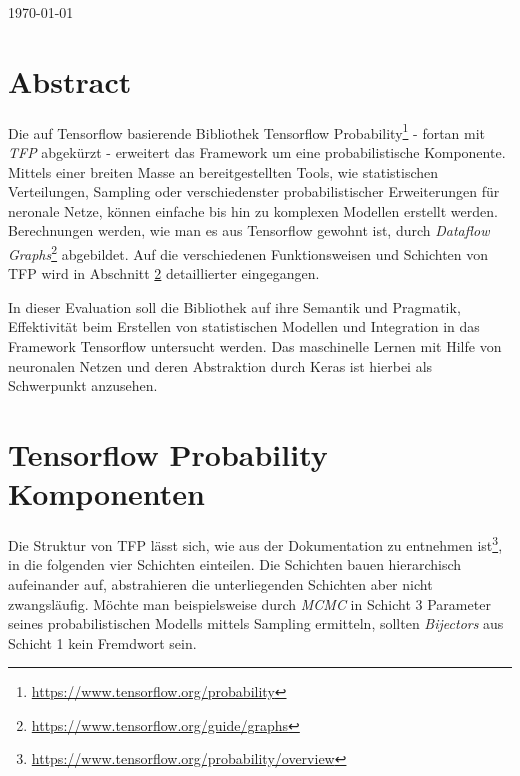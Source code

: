 \documentclass[12pt]{article}
\begin{document}
\begin{titlepage}
\begin{center}

\vspace{\fill} %

{\large \today}\\[3cm] %

\end{center}

\end{titlepage}



\tableofcontents

\newpage


\section{Abstract}
\label{abstract}
Die auf Tensorflow basierende Bibliothek Tensorflow Probability\footnote{\url{https://www.tensorflow.org/probability}} - fortan mit \textit{TFP} abgekürzt - erweitert das Framework um eine probabilistische Komponente.
Mittels einer breiten Masse an bereitgestellten Tools, wie statistischen Verteilungen, Sampling oder verschiedenster probabilistischer Erweiterungen für neronale Netze, können einfache bis hin zu komplexen Modellen erstellt werden. Berechnungen werden, wie man es aus Tensorflow gewohnt ist, durch \textit{Dataflow Graphs}\footnote{\url{https://www.tensorflow.org/guide/graphs}} abgebildet. Auf die verschiedenen Funktionsweisen und Schichten von TFP wird in Abschnitt \ref{sec:tfp-components} detaillierter eingegangen.

In dieser Evaluation soll die Bibliothek auf ihre Semantik und Pragmatik, Effektivität beim Erstellen von statistischen Modellen und Integration in das Framework Tensorflow untersucht werden. Das maschinelle Lernen mit Hilfe von neuronalen Netzen und deren Abstraktion durch Keras ist hierbei als Schwerpunkt anzusehen.

\section{Tensorflow Probability Komponenten}
\label{sec:tfp-components}
Die Struktur von TFP lässt sich, wie aus der Dokumentation zu entnehmen ist\footnote{\url{https://www.tensorflow.org/probability/overview}}, in die folgenden vier Schichten einteilen. Die Schichten bauen hierarchisch aufeinander auf, abstrahieren die unterliegenden Schichten aber nicht zwangsläufig. Möchte man beispielsweise durch \textit{MCMC} in Schicht 3 Parameter seines probabilistischen Modells mittels Sampling ermitteln, sollten \textit{Bijectors} aus Schicht 1 kein Fremdwort sein.
\end{document}
